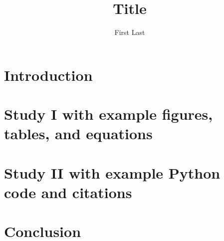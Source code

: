 \documentclass[11pt]{report}
\begin{document}
\title{Title}

\author{First Last}



\begin{preface}
  

  

  {
  \hypersetup{hidelinks} %
  \tableofcontents
  \listoftables
  \listoffigures
  }

  
\end{preface}

\chapter{Introduction} \label{ch:introduction}


\chapter{Study I with example figures, tables, and equations} \label{ch:study-i}


\chapter{Study II with example Python code and citations} \label{ch:study-ii}


\chapter{Conclusion} \label{ch:conclusion}


\begin{singlespace}

  \setlength{}

  \raggedright
  \printbibliography[title=Bibliography]
\end{singlespace}
\end{document}
